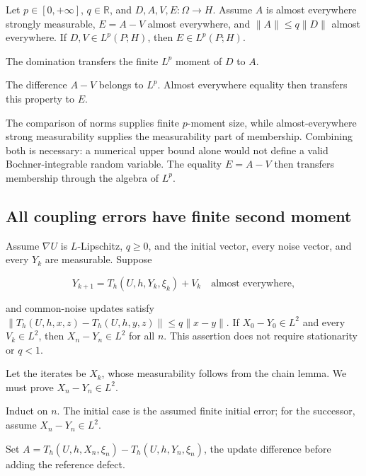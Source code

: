 \documentclass[11pt,a4paper]{report}
\begin{document}
Let \(p\in[0,+\infty]\), \(q\in\mathbb R\), and \(D,A,V,E:\Omega\to H\). Assume \(A\) is almost everywhere strongly measurable, \(E=A-V\) almost everywhere, and \(\|A\|\le q\|D\|\) almost everywhere. If \(D,V\in L^p(P;H)\), then \(E\in L^p(P;H)\).



The domination transfers the finite \(L^p\) moment of \(D\) to \(A\).



The difference \(A-V\) belongs to \(L^p\). Almost everywhere equality then transfers this property to \(E\).



The comparison of norms supplies finite \(p\)-moment size, while almost-everywhere strong measurability supplies the measurability part of membership. Combining both is necessary: a numerical upper bound alone would not define a valid Bochner-integrable random variable. The equality \(E=A-V\) then transfers membership through the algebra of \(L^p\).

\subsection{\texorpdfstring{All coupling errors have finite second moment}{All coupling errors have finite second moment}}
\label{report-step-UnadjustedLangevin-Integrability-lean-2}


Assume \(\nabla U\) is \(L\)-Lipschitz, \(q\ge0\), and the initial vector, every noise vector, and every \(Y_k\) are measurable. Suppose

\[Y_{k+1}=T_h(U,h,Y_k,\xi_k)+V_k\quad\text{almost everywhere},\]

and common-noise updates satisfy \(\|T_h(U,h,x,z)-T_h(U,h,y,z)\|\le q\|x-y\|\). If \(X_0-Y_0\in L^2\) and every \(V_k\in L^2\), then \(X_n-Y_n\in L^2\) for all \(n\). This assertion does not require stationarity or \(q<1\).



Let the iterates be \(X_k\), whose measurability follows from the chain lemma. We must prove \(X_n-Y_n\in L^2\).



Induct on \(n\). The initial case is the assumed finite initial error; for the successor, assume \(X_n-Y_n\in L^2\).



Set \(A=T_h(U,h,X_n,\xi_n)-T_h(U,h,Y_n,\xi_n)\), the update difference before adding the reference defect.
\end{document}
